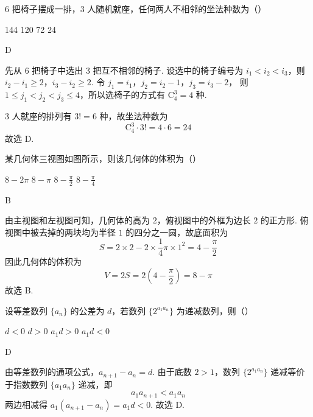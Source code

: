 \begin{problem}
6 把椅子摆成一排，3 人随机就座，任何两人不相邻的坐法种数为（\quad）

\choices
    {144}
    {120}
    {72}
    {24}
\end{problem}

\begin{answer}
D
\end{answer}

\begin{solution}
先从 6 把椅子中选出 3 把互不相邻的椅子. 设选中的椅子编号为 \(i_1<i_2<i_3\)，则 \(i_2-i_1\geqslant2\)，\(i_3-i_2\geqslant2\). 令
\(j_1=i_1\)，\(j_2=i_2-1\)，\(j_3=i_3-2\)，
则 \(1\leqslant j_1<j_2<j_3\leqslant4\)，所以选椅子的方式有 \(\mathrm C_4^3=4\) 种.

3 人就座的排列有 \(3!=6\) 种，故坐法种数为
\[
\mathrm C_4^3\cdot3!=4\cdot6=24
\]
故选 D.
\end{solution}

\begin{problem}
某几何体三视图如图所示，则该几何体的体积为（\quad）


\choices
    {\(8 - 2\pi\)}
    {\(8 - \pi\)}
    {\(8 - \frac{\pi}{2}\)}
    {\(8 - \frac{\pi}{4}\)}
\end{problem}

\begin{answer}
B
\end{answer}

\begin{solution}
由主视图和左视图可知，几何体的高为 \(2\)，俯视图中的外框为边长 \(2\) 的正方形. 俯视图中被去掉的两块均为半径 \(1\) 的四分之一圆，故底面积为
\[
S=2\times2-2\times\frac14\pi\times1^2=4-\frac\pi2
\]
因此几何体的体积为
\[
V=2S=2\left(4-\frac\pi2\right)=8-\pi
\]
故选 B.
\end{solution}

\begin{problem}
设等差数列 \(\{a_{n}\}\) 的公差为 \(d\)，若数列 \(\{2^{a_{1}a_{n}}\}\) 为递减数列，则（\quad）

\choices
    {\(d < 0\)}
    {\(d > 0\)}
    {\(a_{1}d > 0\)}
    {\(a_{1}d < 0\)}
\end{problem}

\begin{answer}
D
\end{answer}

\begin{solution}
由等差数列的通项公式，\(a_{n+1}-a_n=d\). 由于底数 \(2>1\)，数列 \(\{2^{a_1a_n}\}\) 递减等价于指数数列 \(\{a_1a_n\}\) 递减，即
\[
a_1a_{n+1}<a_1a_n
\]
两边相减得 \(a_1(a_{n+1}-a_n)=a_1d<0\). 故选 D.
\end{solution}

